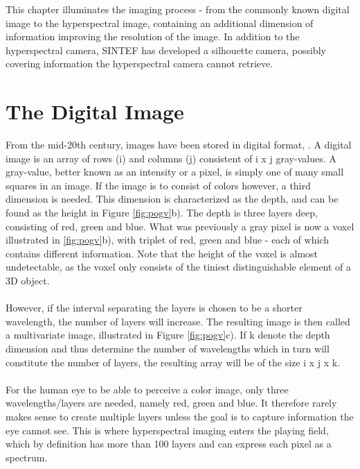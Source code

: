 This chapter illuminates the imaging process - from the commonly known digital image to the hyperspectral image, containing an additional dimension of information improving the resolution of the image. In addition to the hyperspectral camera, SINTEF has developed a silhouette camera, possibly covering information the hyperspectral camera cannot retrieve.


\section{The Digital Image}
From the mid-20th century, images have been stored in digital format, \cite{hia}. A digital image is an array of rows (i) and columns (j) consistent of i x j gray-values. A gray-value, better known as an intensity or a pixel, is simply one of many small squares in an image. If the image is to consist of colors however, a third dimension is needed. This dimension is characterized as the depth, and can be found as the height in Figure \ref{fig:pogv}b). The depth is three layers deep, consisting of red, green and blue. What was previously a gray pixel is now a voxel illustrated in \ref{fig:pogv}b), with triplet of red, green and blue - each of which contains different information. Note that the height of the voxel is almost undetectable, as the voxel only consists of the tiniest distinguishable element of a 3D object. \cite{hia}
\\\\
However, if the interval separating the layers is chosen to be a shorter wavelength, the number of layers will increase. The resulting image is then called a multivariate image, illustrated in Figure \ref{fig:pogv}c). If k denote the depth dimension and thus determine the number of wavelengths which in turn will constitute the number of layers, the resulting array will be of the size i x j x k.
\\\\
For the human eye to be able to perceive a color image, only three wavelengths/layers are needed, namely red, green and blue. It therefore rarely makes sense to create multiple layers unless the goal is to capture information the eye cannot see. This is where hyperspectral imaging enters the playing field, which by definition has more than 100 layers and can express each pixel as a spectrum.

